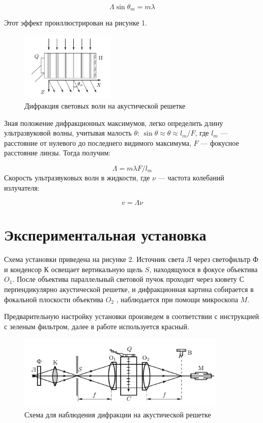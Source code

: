 \documentclass[12pt,a4paper]{article}
\begin{document}
	\begin{equation}	
		\Lambda \sin \theta_m = m \lambda
	\end{equation}
	
	Этот эффект проиллюстрирован на рисунке 1.
	\begin{figure}[h!]
		\centering	
		\includegraphics[width=0.4\textwidth]{res/image_1}
		\caption{Дифракция световых волн на акустической решетке}
		\label{diff}
	\end{figure}
	
	Зная положение дифракционных максимумов, легко определить длину ультразвуковой волны, учитывая малость $ \theta $: $ \sin \theta \approx \theta \approx l_m /F  $, где $ l_m $ --- расстояние от нулевого до последнего видимого максимума, $ F $ --- фокусное расстояние линзы. Тогда получим:
	
	\begin{equation*}
		\Lambda = m \lambda F/ l_m 
	\end{equation*}
	Скорость ультразвуковых волн в жидкости, где $ \nu $ --- частота колебаний излучателя:
	
	\begin{equation*}
		v = \Lambda \nu 
	\end{equation*}
	
	\section*{Экспериментальная установка}
	
	Схема установки приведена на рисунке 2. Источник света Л через светофильтр Ф и конденсор К освещает вертикальную щель $ S $, находящуюся в фокусе объектива $ O_1 $. После объектива параллельный световой пучок проходит через кювету С перпендикулярно акустической решетке, и дифракционная картина собирается в фокальной плоскости объектива $ O_2 $ , наблюдается при помощи микроскопа $M$.
	
	Предварительную настройку установки произведем в соответствии с инструкцией с зеленым фильтром, далее в работе используется красный.
	
	\begin{figure}[h!]
		\centering	
		\includegraphics[width=10cm]{res/image_2}
		\caption{Схема для наблюдения дифракции на акустической решетке}
		\label{shema1}
	\end{figure}
	
\end{document}
